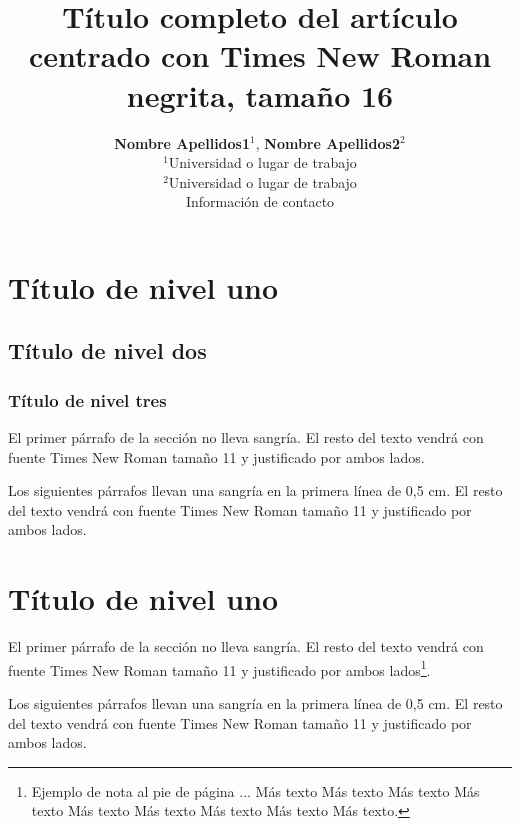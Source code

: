\documentclass[a4paper,11pt,twocolumn,twoside]{article}
\title{Título completo del artículo centrado con Times New Roman negrita, tamaño 16}
\author {\textbf{Nombre Apellidos1$^1$}, \textbf{Nombre Apellidos2$^2$}\\
$^1$Universidad o lugar de trabajo\\
$^2$Universidad o lugar de trabajo\\
Información de contacto\\
}
\begin{document}



\label{firstpage} \maketitle

%

\section{Título de nivel uno}

\subsection{Título de nivel dos}

\subsubsection{Título de nivel tres}

El primer párrafo de la sección no lleva sangría. El resto del
texto vendrá con fuente Times New Roman tamaño 11 y justificado
por ambos lados.

Los siguientes párrafos llevan una sangría en la primera línea de
0,5 cm. El resto del texto vendrá con fuente Times New Roman
tamaño 11 y justificado por ambos lados.


\section{Título de nivel uno}

El primer párrafo de la sección no lleva sangría. El resto del
texto vendrá con fuente Times New Roman tamaño 11 y justificado
por ambos lados\footnote{Ejemplo de nota al pie de página ... Más
texto Más texto Más texto Más texto Más texto Más texto Más texto
Más texto Más texto.}.

Los siguientes párrafos llevan una sangría en la primera línea de
0,5 cm. El resto del texto vendrá con fuente Times New Roman
tamaño 11 y justificado por ambos lados.
\end{document}
